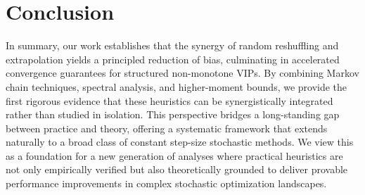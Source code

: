\section{Conclusion}
In summary, our work establishes that the synergy of random reshuffling and extrapolation yields a principled reduction of bias, culminating in accelerated convergence guarantees for structured non-monotone VIPs.  
By combining Markov chain techniques, spectral analysis, and higher-moment bounds, we provide the first rigorous evidence that these heuristics can be synergistically integrated rather than studied in isolation.  
This perspective bridges a long-standing gap between practice and theory, offering a systematic framework that extends naturally to a broad class of constant step-size stochastic methods.  
We view this as a foundation for a new generation of analyses where practical heuristics are not only empirically verified but also theoretically grounded to deliver provable performance improvements in complex stochastic optimization landscapes.




